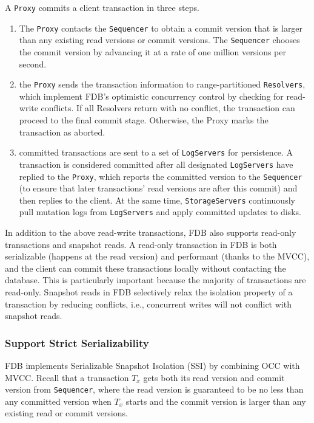 \documentclass[11pt]{article}
\begin{document}
A \texttt{Proxy} commits a client transaction in three steps.
\begin{enumerate}
\item The \texttt{Proxy} contacts the \texttt{Sequencer} to obtain a commit version that is larger than any existing read
versions or commit versions. The \texttt{Sequencer} chooses the commit version by advancing it at a rate of
one million versions per second.
\item the \texttt{Proxy} sends the transaction information to range-partitioned \texttt{Resolvers}, which implement FDB’s
optimistic concurrency control by checking for read-write conflicts. If all Resolvers return with
no conflict, the transaction can proceed to the final commit stage. Otherwise, the Proxy marks the
transaction as aborted.
\item committed transactions are sent to a set of \texttt{LogServers} for persistence. A transaction is considered
committed after all designated \texttt{LogServers} have replied to the \texttt{Proxy}, which reports the committed
version to the \texttt{Sequencer} (to ensure that later transactions’ read versions are after this commit)
and then replies to the client. At the same time, \texttt{StorageServers} continuously pull mutation logs
from \texttt{LogServers} and apply committed updates to disks.
\end{enumerate}

In addition to the above read-write transactions, FDB also supports read-only transactions and
snapshot reads. A read-only transaction in FDB is both serializable (happens at the read version) and
performant (thanks to the MVCC), and the client can commit these transactions locally without
contacting the database. This is particularly important because the majority of transactions are
read-only. Snapshot reads in FDB selectively relax the isolation property of a transaction by reducing
conflicts, i.e., concurrent writes will not conflict with snapshot reads.
\subsubsection{Support Strict Serializability}
\label{sec:org3c5523a}
FDB implements Serializable Snapshot Isolation (SSI) by combining OCC with MVCC. Recall that a
transaction \(T_x\) gets both its read version and commit version from \texttt{Sequencer}, where the read
version is guaranteed to be no less than any committed version when \(T_x\) starts and the commit
version is larger than any existing read or commit versions.
\end{document}
